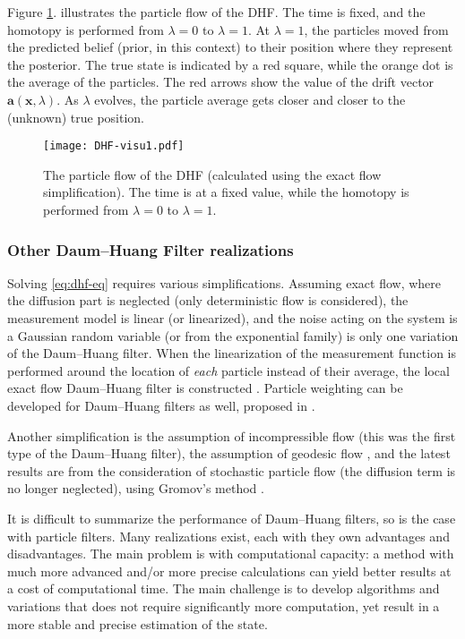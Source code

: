 Figure \ref{fig:dhf-ill}. illustrates the particle flow of the DHF. The time is fixed, and the homotopy is performed from $\lambda = 0$ to $\lambda = 1$. At $\lambda = 1$, the particles moved from the predicted belief (prior, in this context) to their position where they represent the posterior. The true state is indicated by a red square, while the orange dot is the average of the particles. The red arrows show the value of the drift vector $\mathbf{a}(\mathbf{x},\lambda)$. As $\lambda$ evolves, the particle average gets closer and closer to the (unknown) true position.

\begin{figure}
    \centering
    \texttt{[image: DHF-visu1.pdf]}
    \caption{The particle flow of the DHF (calculated using the exact flow simplification). The time is at a fixed value, while the homotopy is performed from $\lambda = 0$ to $\lambda = 1$.}
    \label{fig:dhf-ill}
\end{figure}

\subsubsection{Other Daum--Huang Filter realizations}

Solving \eqref{eq:dhf-eq} requires various simplifications. Assuming exact flow, where the diffusion part is neglected (only deterministic flow is considered), the measurement model is linear (or linearized), and the noise acting on the system is a Gaussian random variable (or from the exponential family) is only one variation of the Daum--Huang filter. When the linearization of the measurement function is performed around the location of \emph{each} particle instead of their average, the local exact flow Daum--Huang filter is constructed \cite{EDH-Coates}. Particle weighting can be developed for Daum--Huang filters as well, proposed in \cite{pfpf_coates}.

Another simplification is the assumption of incompressible flow \cite{dhf_first}  (this was the first type of the Daum--Huang filter), the assumption of geodesic flow \cite{geodesic}, and the latest results are from the consideration of stochastic particle flow (the diffusion term is no longer neglected), using Gromov's method \cite{gromov}.

It is difficult to summarize the performance of Daum--Huang filters, so is the case with particle filters. Many realizations exist, each with they own advantages and disadvantages. The main problem is with computational capacity: a method with much more advanced and/or more precise calculations can yield better results at a cost of computational time. The main challenge is to develop algorithms and variations that does not require significantly more computation, yet result in a more stable and precise estimation of the state.